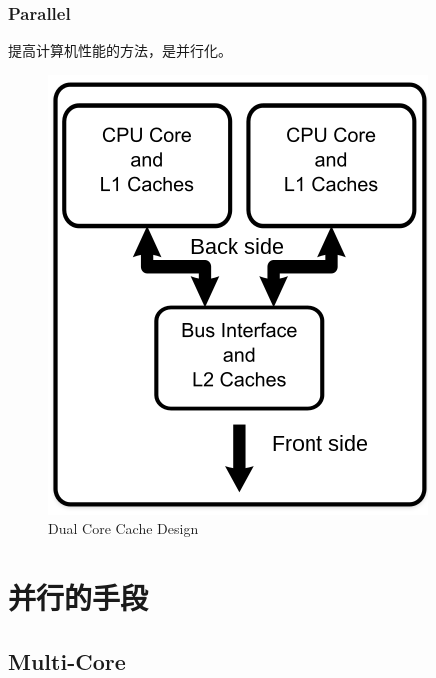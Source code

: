 \documentclass[aspectratio=169]{ctexbeamer}
\begin{document}
\begin{frame}
    \frametitle{Parallel}

    提高计算机性能的方法，是并行化。

    \begin{figure}[h]
        \includegraphics[height=0.5\textheight]{images/dual_core.png}
        \caption{Dual Core Cache Design}
    \end{figure}

\end{frame}

\section{并行的手段}

\subsection{Multi-Core}
\end{document}
